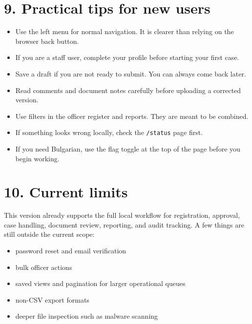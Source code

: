 \documentclass[11pt,a4paper]{article}
\begin{document}
\section*{9. Practical tips for new users}
\begin{itemize}
  \item Use the left menu for normal navigation. It is clearer than relying on the browser back button.
  \item If you are a staff user, complete your profile before starting your first case.
  \item Save a draft if you are not ready to submit. You can always come back later.
  \item Read comments and document notes carefully before uploading a corrected version.
  \item Use filters in the officer register and reports. They are meant to be combined.
  \item If something looks wrong locally, check the \texttt{/status} page first.
  \item If you need Bulgarian, use the flag toggle at the top of the page before you begin working.
\end{itemize}

\section*{10. Current limits}
This version already supports the full local workflow for registration, approval, case handling, document review, reporting, and audit tracking. A few things are still outside the current scope:

\begin{itemize}
  \item password reset and email verification
  \item bulk officer actions
  \item saved views and pagination for larger operational queues
  \item non-CSV export formats
  \item deeper file inspection such as malware scanning
\end{itemize}
\end{document}
